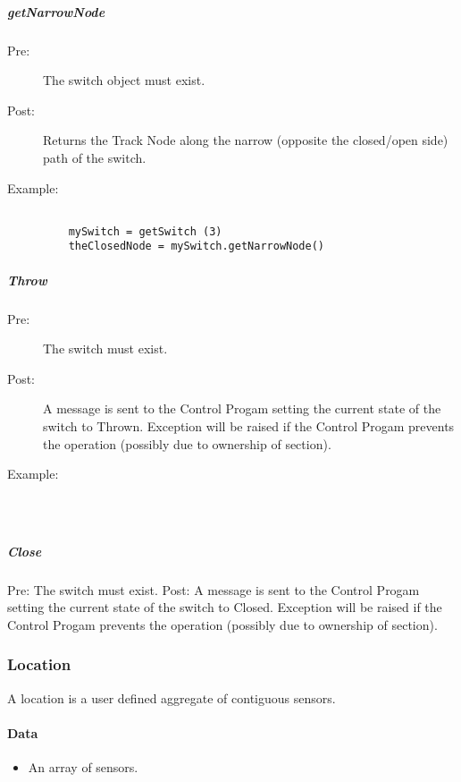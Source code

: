 \documentclass[a4paper,11pt,notitlepage]{article}
\def\CS{Control Progam\xspace} \def\LC{Local Copy of Train State\xspace} \def\TN{Track Node\xspace}
\begin{document}
\subparagraph{getNarrowNode}
\begin{description}
\item[\hspace{1cm}Pre:] The switch object must exist.
\item[\hspace{1cm}Post:] Returns the \TN along the narrow (opposite the closed/open side) path of the switch.
\item[\hspace{1cm}Example:]
\begin{verbatim}

    mySwitch = getSwitch (3)
    theClosedNode = mySwitch.getNarrowNode()
\end{verbatim}
\end{description}

\subparagraph{Throw}
\begin{description}
\item[\hspace{1cm}Pre:] The switch must exist.
\item[\hspace{1cm}Post:] A message is sent to the \CS setting the current state of the switch to Thrown. Exception will be raised if the \CS prevents the operation (possibly due to ownership of section).
\item[\hspace{1cm}Example:]
\begin{verbatim}

    
\end{verbatim}
\end{description}

\subparagraph{Close} Pre: The switch must exist.  Post:  A message is sent to the \CS setting the current state of the switch to Closed. Exception will be raised if the \CS prevents the operation (possibly due to ownership of section).

\subsubsection{Location}
A location is a user defined aggregate of contiguous sensors.
\paragraph{Data}
\begin{itemize}
\item An array of sensors.
\end{itemize}
\end{document}
